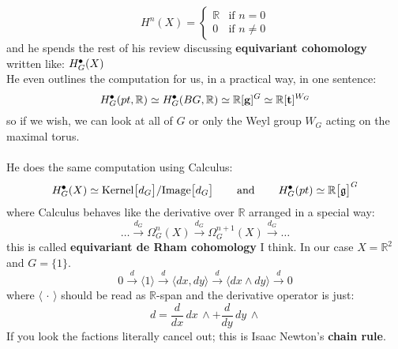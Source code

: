 \documentclass[12pt]{article}
\begin{document}
$$ H^n (X) = \left\{
\begin{array}{cc}
\mathbb{R} & \text{if }n = 0\\ 
0 &  \text{if }n \neq 0 
\end{array}
  \right.$$
and he spends the rest of his review discussing \textbf{equivariant cohomology} written like: $H^{\begin{tikz} \draw[fill=black] (0,0) circle (0.05); \end{tikz}}_G(X)$ \\
He even outlines the computation for us, in a practical way, in one sentence:
$$
H^{\begin{tikz} \draw[fill=black] (0,0) circle (0.05); \end{tikz}}_G( pt , \mathbb{R})
 \simeq 
 H^{\begin{tikz} \draw[fill=black] (0,0) circle (0.05); \end{tikz}}_G( BG , \mathbb{R})
 \simeq 
 \mathbb{R}[\mathfrak{\mathbf{g}}]^G 
 \simeq  
 \mathbb{R}[\mathfrak{\mathbf{t}}]^{W_G} 
 $$
 so if we wish, we can look at all of $G$ or only the Weyl group $W_G$ acting on the maximal torus. \\ \\
 He does the same computation using Calculus:
 $$
 H^{\begin{tikz} \draw[fill=black] (0,0) circle (0.05); \end{tikz}}_G( X)
 \simeq \mathrm{Kernel}\big[ d_G\big] / \mathrm{Image}\big[ d_G \big]
 \hspace{0.25in}
 \text{ and }\hspace{0.25in}
 H^{\begin{tikz} \draw[fill=black] (0,0) circle (0.05); \end{tikz}}_G( pt)
 \simeq \mathbb{R} \big[ \mathbf{\mathfrak{g}} \big]^G
   $$
where Calculus behaves like the derivative over $\mathbb{R}$ arranged in a special way:
$$ \dots \stackrel{d_G}{\to} \Omega^n_G(X) \stackrel{d_G}{\to} \Omega^{n+1}_G(X) \stackrel{d_G}{\to} \dots $$
this is called \textbf{equivariant de Rham cohomology} I think.  In our case $X = \mathbb{R}^2$ and $G = \{1\}$.
$$  0 \stackrel{d}{\to}
\langle 1 \rangle  \stackrel{d}{\to}
 \langle dx, dy \rangle \stackrel{d}{\to} \langle dx \wedge dy \rangle  \stackrel{d}{\to} 0 
 $$
where $\langle \,\cdot \,\rangle$ should be read as $\mathbb{R}$-span and the derivative operator is just:
$$ d = \frac{d}{dx} \, dx \,\wedge  + \frac{d}{dy} \, dy \,\wedge   $$
If you look the factions literally cancel out; this is Isaac Newton's \textbf{chain rule}.
\end{document}
